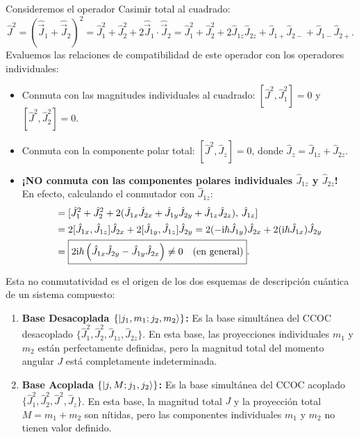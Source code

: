 Consideremos el operador Casimir total al cuadrado:
\begin{equation}
    \hat{J}^2 = (\hat{\vec{J}}_1 + \hat{\vec{J}}_2)^2 = \hat{J}_1^2 + \hat{J}_2^2 + 2\hat{\vec{J}}_1\cdot\hat{\vec{J}}_2 = \hat{J}_1^2 + \hat{J}_2^2 + 2\hat{J}_{1z}\hat{J}_{2z} + \hat{J}_{1+}\hat{J}_{2-} + \hat{J}_{1-}\hat{J}_{2+}.
    \label{eq:j2_expansion_coupled}
\end{equation}
Evaluemos las relaciones de compatibilidad de este operador con los operadores individuales:
\begin{itemize}
    \item Conmuta con las magnitudes individuales al cuadrado: $[\hat{J}^2, \hat{J}_1^2] = 0$ y $[\hat{J}^2, \hat{J}_2^2] = 0$.
    \item Conmuta con la componente polar total: $[\hat{J}^2, \hat{J}_z] = 0$, donde $\hat{J}_z = \hat{J}_{1z} + \hat{J}_{2z}$.
    \item \textbf{¡NO conmuta con las componentes polares individuales $\hat{J}_{1z}$ y $\hat{J}_{2z}$!}\\
    En efecto, calculando el conmutador con $\hat{J}_{1z}$:
    \begin{align}
        [\hat{J}^2, \hat{J}_{1z}] &= [\hat{J}_1^2 + \hat{J}_2^2 + 2(\hat{J}_{1x}\hat{J}_{2x} + \hat{J}_{1y}\hat{J}_{2y} + \hat{J}_{1z}\hat{J}_{2z}), \, \hat{J}_{1z}] \nonumber\\
        &= 2[\hat{J}_{1x}, \hat{J}_{1z}]\hat{J}_{2x} + 2[\hat{J}_{1y}, \hat{J}_{1z}]\hat{J}_{2y} = 2(-\iu\hbar\hat{J}_{1y})\hat{J}_{2x} + 2(\iu\hbar\hat{J}_{1x})\hat{J}_{2y} \nonumber\\
        &= \boxed{2\iu\hbar\left(\hat{J}_{1x}\hat{J}_{2y} - \hat{J}_{1y}\hat{J}_{2x}\right) \neq 0 \quad (\text{en general})}.
    \end{align}
\end{itemize}
Esta no conmutatividad es el origen de los dos esquemas de descripción cuántica de un sistema compuesto:
\begin{enumerate}
    \item \textbf{Base Desacoplada $\{\left| j_1, m_1; j_2, m_2 \right\rangle\}$:} Es la base simultánea del CCOC desacoplado $\{\hat{J}_1^2, \hat{J}_2^2, \hat{J}_{1z}, \hat{J}_{2z}\}$. En esta base, las proyecciones individuales $m_1$ y $m_2$ están perfectamente definidas, pero la magnitud total del momento angular $J$ está completamente indeterminada.
    \item \textbf{Base Acoplada $\{\left| j, M; j_1, j_2 \right\rangle\}$:} Es la base simultánea del CCOC acoplado $\{\hat{J}_1^2, \hat{J}_2^2, \hat{J}^2, \hat{J}_z\}$. En esta base, la magnitud total $J$ y la proyección total $M = m_1 + m_2$ son nítidas, pero las componentes individuales $m_1$ y $m_2$ no tienen valor definido.
\end{enumerate}

